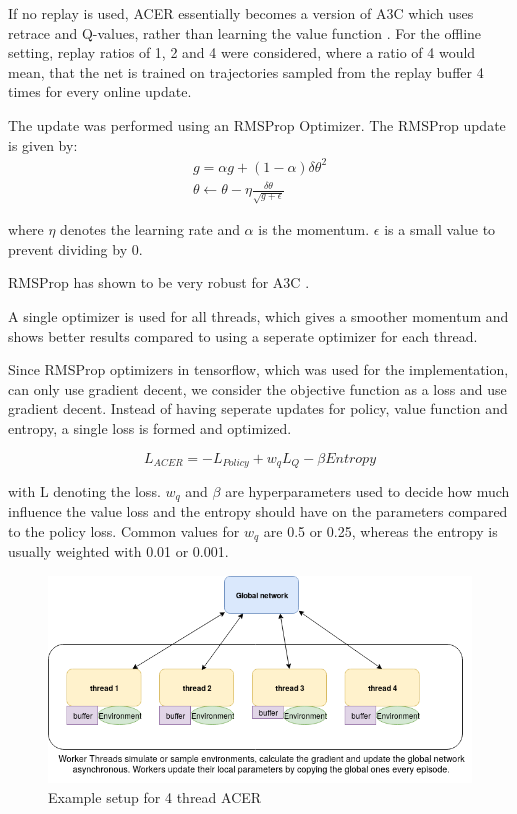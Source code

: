 If no replay is used, ACER essentially becomes a version of A3C which uses retrace and Q-values, rather than learning the value function \citep{A3C}. \linebreak
For the offline setting, replay ratios of 1, 2 and 4 were considered, where a ratio of 4 would mean, that the net is trained on trajectories sampled from the replay buffer 4 times for every online update.

The update was performed using an RMSProp Optimizer.
The RMSProp update is given by:
\begin{align}
g = \alpha g + (1- \alpha) \delta \theta^2 \\ \theta \gets \theta - \eta \frac{\delta \theta}{ \sqrt{g+\epsilon}}
\end{align}

where $\eta$ denotes the learning rate and $\alpha$ is the momentum. $\epsilon$ is a small value to prevent dividing by 0.

RMSProp has shown to be very robust for A3C \citep{A3C}.

A single optimizer is used for all threads, which gives a smoother momentum and shows better results compared to using a seperate optimizer for each thread.

Since RMSProp optimizers in tensorflow, which was used for the implementation, can only use gradient decent, we consider the objective function as a loss and use gradient decent. Instead of having seperate updates for policy, value function and entropy, a single loss is formed and optimized.

\begin{equation}
L_{ACER} = - L_{Policy} + w_q L_{Q} - \beta Entropy
\end{equation}

with L denoting the loss. $w_q$ and $\beta$ are hyperparameters used to decide how much influence the value loss and the entropy should have on the parameters compared to the policy loss. Common values for $w_q$ are 0.5 or 0.25, whereas the entropy is usually weighted with 0.01 or 0.001.

\begin{figure}
\begin{center}

\includegraphics[scale=0.5]{bilder/ACERarchitecture.png}
\caption{Example setup for 4 thread ACER}
\end{center}

\end{figure}
\pagebreak
